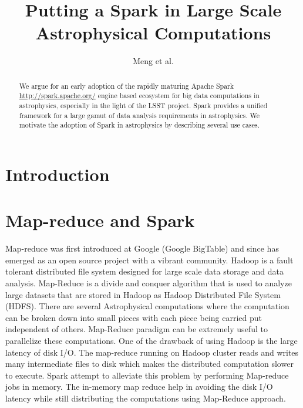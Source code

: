 \documentclass[twocolumn, prd]{revtex4}
\begin{document}
\title{Putting  a Spark in Large Scale Astrophysical Computations}
\author{Meng et al.}
\begin{abstract}
We  argue for an early adoption of the rapidly maturing  Apache Spark {\url{http://spark.apache.org/}} engine based ecosystem for  big data computations in astrophysics, especially in the light of the LSST project.  Spark provides a unified framework for a large gamut of data analysis requirements in astrophysics. We motivate the adoption of Spark in astrophysics by describing several use cases. 
\end{abstract}
\maketitle
\section{Introduction}

\section{Map-reduce and Spark}
Map-reduce was first introduced at Google (Google BigTable) and since has emerged as an open source project with a vibrant community. Hadoop is a fault tolerant distributed file system designed for large scale data storage and data analysis. Map-Reduce is a divide and conquer algorithm that is used to analyze large datasets that are stored in Hadoop as Hadoop Distributed File System (HDFS). There are several Astrophysical computations where the computation can be broken down into small pieces with each piece being carried put independent of others. Map-Reduce paradigm can be extremely useful to parallelize these computations. One of the drawback of using Hadoop is the large latency of disk I/O. The map-reduce running on Hadoop cluster reads and writes many intermediate files to disk which makes the distributed computation slower to execute. Spark attempt to alleviate this problem by performing Map-reduce jobs in memory.  The  in-memory map reduce help in avoiding the disk I/O latency while still distributing the computations using Map-Reduce approach.
\end{document}
